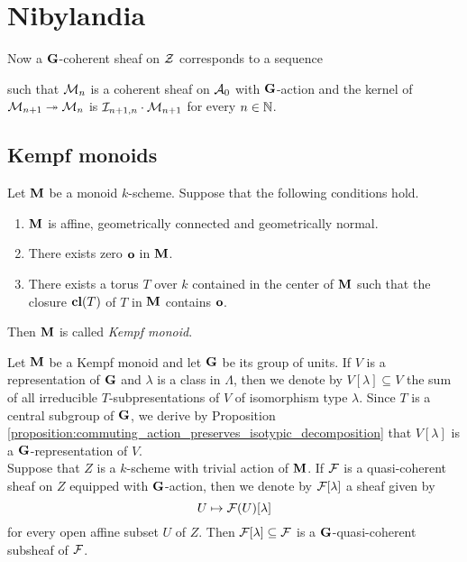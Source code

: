 \section{Nibylandia }
\noindent



Now a $\mathbf{G}$-coherent sheaf on ${\mathcal Z}$ corresponds to a sequence

such that ${\mathcal M}_n$ is a coherent sheaf on ${\mathcal A}_0$ with $\mathbf{G}$-action and the kernel of ${\mathcal M}_{n+1}\twoheadrightarrow {\mathcal M}_n$ is ${\mathcal I}_{n+1,n}\cdot {\mathcal M}_{n+1}$ for every $n\in {\mathbb N}$.

\subsection{Kempf monoids}

\begin{definition}
Let $\mathbf{M}$ be a monoid $k$-scheme. Suppose that the following conditions hold.
\begin{enumerate}[label=\textbf{(\arabic*)}, leftmargin=1.5em]
\item $\mathbf{M}$ is affine, geometrically connected and geometrically normal.
\item There exists zero $\mathbf{o}$ in $\mathbf{M}$.
\item There exists a torus $T$ over $k$ contained in the center of $\mathbf{M}$ such that the closure $\mathbf{cl}(T)$ of $T$ in $\mathbf{M}$ contains $\mathbf{o}$.
\end{enumerate}
Then $\mathbf{M}$ is called \textit{Kempf  monoid}.
\end{definition}
\noindent
Let $\mathbf{M}$ be a Kempf monoid and let $\mathbf{G}$ be its group of units. If $V$ is a representation of $\mathbf{G}$ and $\lambda$ is a class in $\Lambda$, then we denote by $V[\lambda]\subseteq V$ the sum of all irreducible $T$-subpresentations of $V$ of isomorphism type $\lambda$. Since $T$ is a central subgroup of $\mathbf{G}$, we derive by Proposition \ref{proposition:commuting_action_preserves_isotypic_decomposition} that $V[\lambda]$ is a $\mathbf{G}$-representation of $V$.\\
Suppose that $Z$ is a $k$-scheme with trivial action of $\mathbf{M}$. If ${\mathcal F}$ is a quasi-coherent sheaf on $Z$ equipped with $\mathbf{G}$-action, then we denote by ${\mathcal F}[\lambda]$ a sheaf given by
$$U\mapsto {\mathcal F}(U)[\lambda]$$
for every open affine subset $U$ of $Z$. Then ${\mathcal F}[\lambda]\subseteq {\mathcal F}$ is a $\mathbf{G}$-quasi-coherent subsheaf of ${\mathcal F}$.








